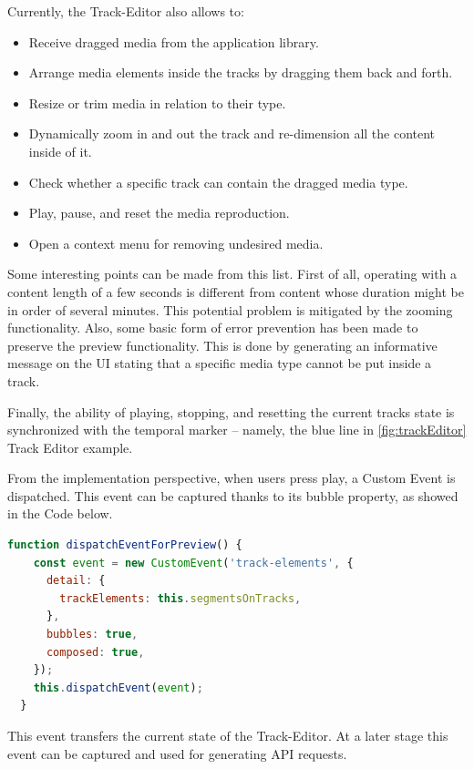 Currently, the Track-Editor also allows to:

\begin{itemize}
\item Receive dragged media from the application library.
\item Arrange media elements inside the tracks by dragging them back and forth.
\item Resize or trim media in relation to their type.
\item Dynamically zoom in and out the track and re-dimension all the content inside of it.
\item Check whether a specific track can contain the dragged media type.
\item Play, pause, and reset the media reproduction.
\item Open a context menu for removing undesired media.
\end{itemize}

Some interesting points can be made from this list. First of all, operating with a content length of a few seconds is different from content whose duration might be in order of several minutes. This potential problem is mitigated by the zooming functionality. Also, some basic form of error prevention has been made to preserve the preview functionality. This is done by generating an informative message on the UI stating that a specific media type cannot be put inside a track.

Finally, the ability of playing, stopping, and resetting the current tracks state is synchronized with the temporal marker – namely, the blue line in \ref{fig:trackEditor} Track Editor example.

From the implementation perspective, when users press play, a Custom Event is dispatched. This event can be captured thanks to its bubble property, as showed in the Code below. 
\\
\begin{lstlisting}[caption={Track Editor event dispatch},label={customEvent}, language=JavaScript]
function dispatchEventForPreview() {
    const event = new CustomEvent('track-elements', {
      detail: {
        trackElements: this.segmentsOnTracks,
      },
      bubbles: true,
      composed: true,
    });
    this.dispatchEvent(event);
  }
\end{lstlisting}

This event transfers the current state of the Track-Editor. At a later stage this event can be captured and used for generating API requests.

